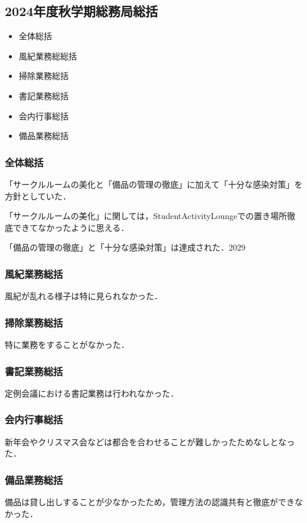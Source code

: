 \subsection*{2024年度秋学期総務局総括}


\begin{itemize}
    \item 全体総括
    \item 風紀業務総総括
    \item 掃除業務総括
    \item 書記業務総括
    \item 会内行事総括
    \item 備品業務総括
\end{itemize}

\subsubsection*{全体総括}

「サークルルームの美化と「備品の管理の徹底」に加えて「十分な感染対策」を方針としていた．

「サークルルームの美化」に関しては，StudentActivityLoungeでの置き場所徹底できてなかったように思える．

「備品の管理の徹底」と「十分な感染対策」は達成された．2029

\subsubsection*{風紀業務総括}

風紀が乱れる様子は特に見られなかった．

\subsubsection*{掃除業務総括}

特に業務をすることがなかった．

\subsubsection*{書記業務総括}

定例会議における書記業務は行われなかった．

\subsubsection*{会内行事総括}

新年会やクリスマス会などは都合を合わせることが難しかったためなしとなった．

\subsubsection*{備品業務総括}
備品は貸し出しすることが少なかったため，管理方法の認識共有と徹底ができなかった．

